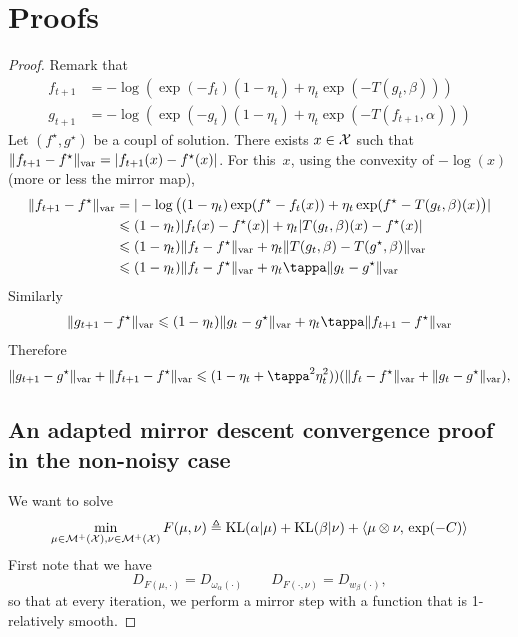 \documentclass[a4paper, 10pt]{article}
\begin{document}
\section{Proofs}

\begin{proof}
Remark that 
\begin{align}
    f_{t+1} &=  - \log (\exp(-f_t) (1 - \eta_t) + \eta_t \exp(-T(g_t, \beta))) \\ 
    g_{t+1} &=  - \log (\exp(-g_t) (1 - \eta_t) + \eta_t \exp(-T(f_{t+1}, \alpha)))
\end{align}
Let $(f^\star, g^\star)$ be a coupl of solution. There exists $x \in \mathcal{X}$ such that $\Vert
f_{t+1} - f^\star \Vert_{\text{var}} = |f_{t+1}(x) - f^\star(x)|$. For this~$x$, using
the convexity of $- \log(x)$ (more or less the mirror map),
\begin{align}
    \Vert f_{t+1} - f^\star \Vert_{\var}
    &=
     |- \log\big((1 - \eta_t) \exp(f^\star -f_t(x)) 
     + \eta_t \exp(f^\star-T(g_t, \beta)(x)\big) |  \\
    &\leq (1 - \eta_t) | f_t(x) - f^\star(x)| + \eta_t | T(g_t,\beta)(x) - f^\star(x)| \\
    &\leq (1 - \eta_t) \Vert f_t - f^\star \Vert_{\var} + \eta_t
    \Vert T(g_t,\beta) - T(g^\star, \beta) \Vert_{\var} \\
    &\leq (1 - \eta_t) \Vert f_t - f^\star \Vert_{\var}
     + \eta_t \tappa \Vert g_t - g^\star \Vert_{\var}
\end{align}
Similarly
\begin{align}
    \Vert g_{t+1} - f^\star \Vert_{\var} \leq
    (1 - \eta_t) \Vert g_t - g^\star \Vert_{\var} +
     \eta_t \tappa \Vert f_{t+1} - f^\star \Vert_{\var}
\end{align}
Therefore
\begin{align}
    \Vert g_{t+1} - g^\star \Vert_{\var} + \Vert f_{t+1} - f^\star \Vert_{\var} \leq
    (1 - \eta_t + \tappa^2 \eta_t^2)) ( \Vert f_t - f^\star \Vert_{\var} 
     + \Vert g_t - g^\star \Vert_{\var} ),
\end{align}

\subsection{An adapted mirror descent convergence proof in the non-noisy case}


We want to solve
\begin{equation}
    \min_{\mu \in \mathcal{M}^+(\mathcal{X}), \nu \in \mathcal{M}^+(\mathcal{X})} 
    F(\mu, \nu) \triangleq \text{KL}(\alpha | \mu) + \text{KL}(\beta | \nu) + \langle \mu \otimes \nu,\,\exp(-C)\rangle
\end{equation}
First note that we have
\begin{equation}
    D_{F(\mu, \cdot)} = D_{\omega_\alpha(\cdot)}\qquad D_{F(\cdot, \nu)} = D_{w_\beta(\cdot)},
\end{equation}
so that at every iteration, we perform a mirror step with a function that is 1-relatively smooth.


\end{proof}
\end{document}
